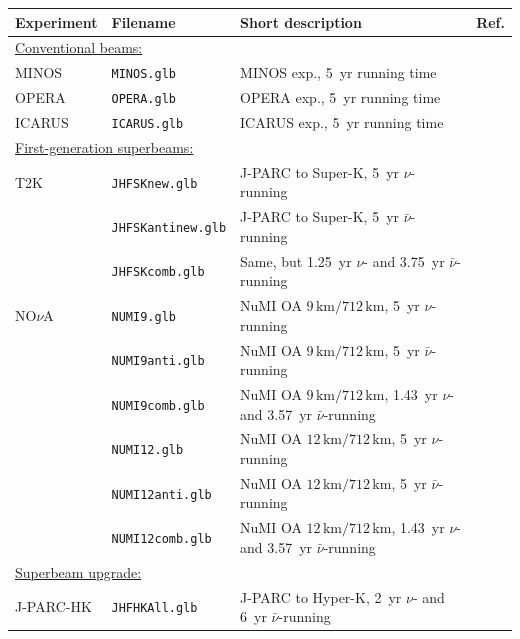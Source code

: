 \begin{table}[tbp]
\begin{center}
\begin{tabular}{llp{7.5cm}c}
\hline
Experiment & Filename & Short description &  Ref. \\
\hline 
\multicolumn{4}{l}{\underline{Conventional beams:}} \\
MINOS & {\tt MINOS.glb} & MINOS exp., 5~yr running time & \cite{Huber:2004ug}\\
OPERA & {\tt OPERA.glb} & OPERA exp., 5~yr running time & \cite{Huber:2004ug}\\
ICARUS & {\tt ICARUS.glb} & ICARUS exp., 5~yr running time & \cite{Huber:2004ug}\\[0.1cm]

\multicolumn{4}{l}{\underline{First-generation superbeams:}} \\
T2K & {\tt JHFSKnew.glb} & J-PARC to Super-K, 5~yr $\nu$-running &  \cite{Huber:2002rs} \\
 & {\tt JHFSKantinew.glb} & J-PARC to Super-K, 5~yr $\bar{\nu}$-running &  \cite{Huber:2002rs} \\
 & {\tt JHFSKcomb.glb} & Same, but 1.25~yr $\nu$- and 3.75~yr $\bar{\nu}$-running &  \cite{Huber:2002rs} \\[0.1cm]
NO$\nu$A & {\tt NUMI9.glb} & NuMI OA $9 \, \mathrm{km}/712 \, \mathrm{km}$, 5~yr $\nu$-running & \cite{Huber:2002rs} \\
& {\tt NUMI9anti.glb} & NuMI OA $9 \, \mathrm{km}/712 \, \mathrm{km}$, 5~yr $\bar{\nu}$-running & \cite{Huber:2002rs} \\
& {\tt NUMI9comb.glb} & NuMI OA $9 \, \mathrm{km}/712 \, \mathrm{km}$, 1.43~yr $\nu$- and 3.57~yr $\bar{\nu}$-running & \cite{Huber:2002rs} \\
& {\tt NUMI12.glb} & NuMI OA $12 \, \mathrm{km}/712 \, \mathrm{km}$, 5~yr $\nu$-running & \cite{Huber:2002rs} \\
& {\tt NUMI12anti.glb} & NuMI OA $12 \, \mathrm{km}/712 \, \mathrm{km}$, 5~yr $\bar{\nu}$-running & \cite{Huber:2002rs} \\
& {\tt NUMI12comb.glb} & NuMI OA $12 \, \mathrm{km}/712 \, \mathrm{km}$, 1.43~yr $\nu$- and 3.57~yr $\bar{\nu}$-running & \cite{Huber:2002rs} \\[0.1cm]
 
\multicolumn{4}{l}{\underline{Superbeam upgrade:}} \\
J-PARC-HK & {\tt JHFHKAll.glb} & J-PARC to Hyper-K, 2~yr $\nu$- and 6~yr $\bar{\nu}$-running &  \cite{Huber:2002mx} \\[0.1cm]


\end{tabular}
\end{center}
\end{table}
